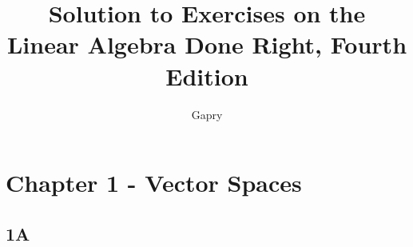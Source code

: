 \documentclass{article}
\title{Solution to Exercises on the \\Linear Algebra Done Right, Fourth Edition}
\author{Gapry}
\begin{document}
\maketitle

\section*{Chapter 1 - Vector Spaces}

\subsection*{1A}

\end{document}
